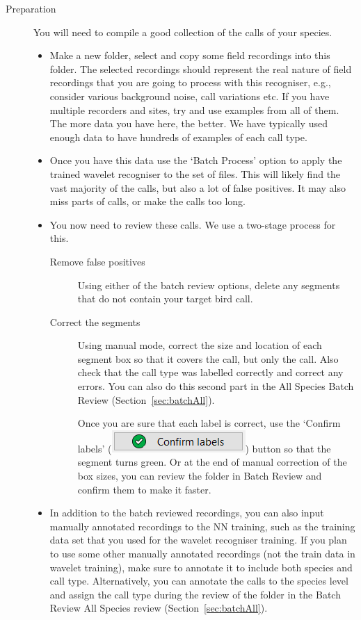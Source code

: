 \documentclass{article}
\begin{document}
\begin{description}
\item[Preparation] You will need to compile a good collection of the calls of your species. 
\begin{itemize}
\item Make a new folder, select and copy some field recordings into this folder. The selected recordings should represent the real nature of field recordings that you are going to process with this recogniser, e.g., consider various background noise, call variations etc. If you have multiple recorders and sites, try and use examples from all of them. The more data you have here, the better. We have typically used enough data to have hundreds of examples of each call type.
\item Once you have this data use the `Batch Process' option to apply the trained wavelet recogniser to the set of files. This will likely find the vast majority of the calls, but also a lot of false positives. It may also miss parts of calls, or make the calls too long. 
\item You now need to review these calls. We use a two-stage process for this.
    \begin{description} 
    \item[Remove false positives] Using either of the batch review options, delete any segments that do not contain your target bird call. 
    \item[Correct the segments] Using manual mode, correct the size and location of each segment box so that it covers the call, but only the call. Also check that the call type was labelled correctly and correct any errors. You can also do this second part in the All Species Batch Review (Section~\ref{sec:batchAll}).

    Once you are sure that each label is correct, use the `Confirm labels' (\includegraphics[scale=0.5]{Figures/confirmlabels}) button so that the segment turns green. Or at the end of manual correction of the box sizes, you can review the folder in Batch Review and confirm them to make it faster.
    \end{description}
\item In addition to the batch reviewed recordings, you can also input manually annotated recordings to the NN training, such as the training data set that you used for the wavelet recogniser training. If you plan to use some other manually annotated recordings (not the train data in wavelet training), make sure to annotate it to include both species and call type. Alternatively, you can annotate the calls to the species level and assign the call type during the review of the folder in the Batch Review All Species review (Section~\ref{sec:batchAll}).
\end{itemize}
\end{description}
 
\end{document}
